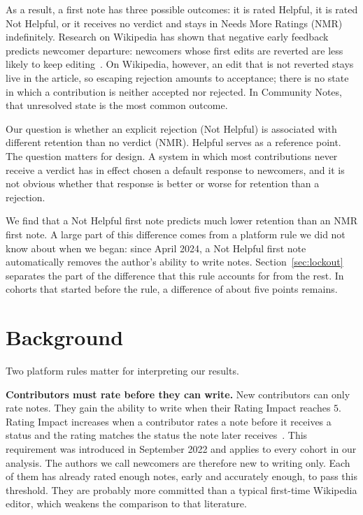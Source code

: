 \documentclass[sigconf,nonacm]{acmart}
\begin{document}
As a result, a first note has three possible outcomes: it is rated Helpful, it is rated Not
Helpful, or it receives no verdict and stays in Needs More Ratings (NMR) indefinitely.
Research on Wikipedia has shown that negative early feedback predicts newcomer departure:
newcomers whose first edits are reverted are less likely to keep
editing~\cite{halfaker2011newbies,halfaker2013rise}. On Wikipedia, however, an edit that is
not reverted stays live in the article, so escaping rejection amounts to acceptance; there
is no state in which a contribution is neither accepted nor rejected. In Community Notes,
that unresolved state is the most common outcome.

Our question is whether an explicit rejection (Not Helpful) is associated with different
retention than no verdict (NMR). Helpful serves as a reference point. The question matters
for design. A system in which most contributions never receive a verdict has in effect
chosen a default response to newcomers, and it is not obvious whether that response is
better or worse for retention than a rejection.

We find that a Not Helpful first note predicts much lower retention than an NMR first note.
A large part of this difference comes from a platform rule we did not know about when we
began: since April 2024, a Not Helpful first note automatically removes the author's
ability to write notes. Section~\ref{sec:lockout} separates the part of the difference that
this rule accounts for from the rest. In cohorts that started before the rule, a difference
of about five points remains.

\section{Background}
\label{sec:system}

Two platform rules matter for interpreting our results.

\textbf{Contributors must rate before they can write.} New contributors can only rate
notes. They gain the ability to write when their Rating Impact reaches $5$. Rating Impact
increases when a contributor rates a note before it receives a status and the rating
matches the status the note later receives~\cite{communitynoteswriting}. This requirement
was introduced in September 2022 and applies to every cohort in our analysis. The authors
we call newcomers are therefore new to writing only. Each of them has already rated enough
notes, early and accurately enough, to pass this threshold. They are probably more
committed than a typical first-time Wikipedia editor, which weakens the comparison to that
literature.
\end{document}
